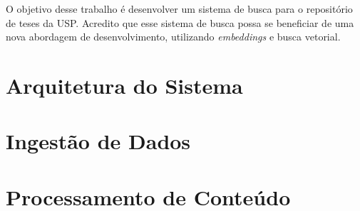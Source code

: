 \documentclass[
	12pt,				%
	openright,			%
	oneside,			%
	a4paper,			%
	english,			%
	french,				%
	spanish,			%
	brazil				%
	]{abntex2}
\begin{document}

O objetivo desse trabalho é desenvolver um sistema de busca para o repositório de teses da USP.
Acredito que esse sistema de busca possa se beneficiar de uma nova abordagem de desenvolvimento,
utilizando \textit{embeddings} e busca vetorial.

\section{Arquitetura do Sistema}\label{sec:arquitetura-do-sistema}

\section{Ingestão de Dados}\label{sec:ingestao-de-dados}

\section{Processamento de Conteúdo}\label{sec:processamento-de-conteudo}
\end{document}
